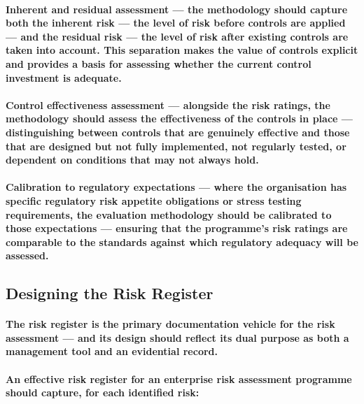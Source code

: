 \paragraph{\textbf{Inherent and residual assessment} — the methodology should capture both the inherent risk — the level of risk before controls are applied — and the residual risk — the level of risk after existing controls are taken into account. This separation makes the value of controls explicit and provides a basis for assessing whether the current control investment is adequate.}
\paragraph{\textbf{Control effectiveness assessment} — alongside the risk ratings, the methodology should assess the effectiveness of the controls in place — distinguishing between controls that are genuinely effective and those that are designed but not fully implemented, not regularly tested, or dependent on conditions that may not always hold.}
\paragraph{\textbf{Calibration to regulatory expectations} — where the organisation has specific regulatory risk appetite obligations or stress testing requirements, the evaluation methodology should be calibrated to those expectations — ensuring that the programme's risk ratings are comparable to the standards against which regulatory adequacy will be assessed.}

\subsection{Designing the Risk Register}
\paragraph{The risk register is the primary documentation vehicle for the risk assessment — and its design should reflect its dual purpose as both a management tool and an evidential record.}
\paragraph{An effective risk register for an enterprise risk assessment programme should capture, for each identified risk:}

